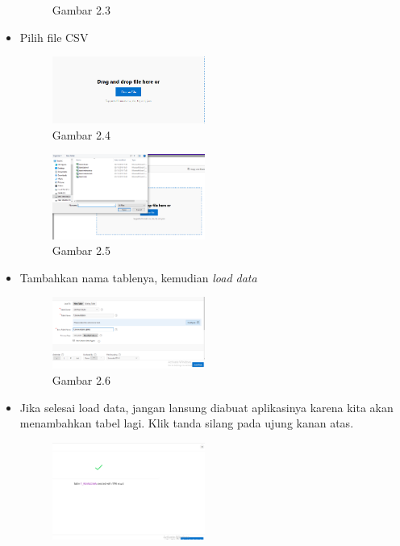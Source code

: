 \documentclass{article}
\begin{document}
\begin{itemize}
\begin{figure}[ht]
                    \caption{Gambar 2.3}
                \end{figure}
            \newpage
            \item Pilih file CSV
                \begin{figure}[ht]
                    \centerline{\includegraphics[width=5cm]{Capture11.PNG}}
                    \caption{Gambar 2.4}
                \end{figure}
                \begin{figure}[ht]
                    \centerline{\includegraphics[width=5cm]{Capture12.PNG}}
                    \caption{Gambar 2.5}
                \end{figure}
            \item Tambahkan nama tablenya, kemudian \textit{load data}
                \begin{figure}[ht]
                    \centerline{\includegraphics[width=5cm]{Capture13.PNG}}
                    \caption{Gambar 2.6}
                \end{figure}
            \newpage
            \item Jika selesai load data, jangan lansung diabuat aplikasinya karena kita akan menambahkan tabel lagi. Klik tanda silang pada ujung kanan atas.
                \begin{figure}[ht]
                    \centerline{\includegraphics[width=5cm]{Capture14.PNG}}

\end{figure}
\end{itemize}
\end{document}
